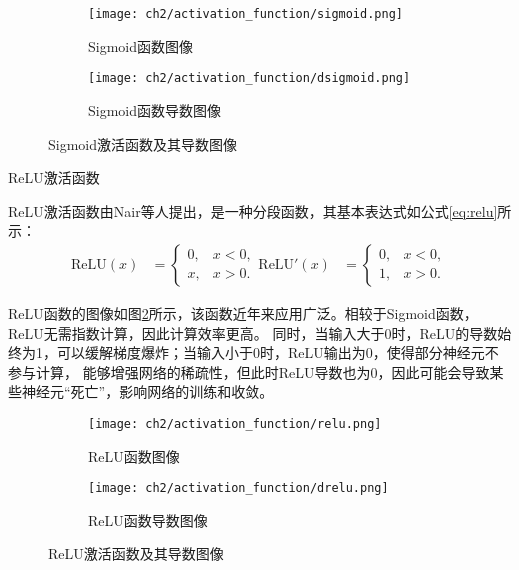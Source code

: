 \begin{figure}[H]
  \centering
  \begin{subfigure}[t]{0.45\textwidth}
    \centering
    \texttt{[image: ch2/activation\_function/sigmoid.png]}
    \caption{Sigmoid函数图像}
  \end{subfigure}
  \begin{subfigure}[t]{0.45\textwidth}
    \centering
    \texttt{[image: ch2/activation\_function/dsigmoid.png]}
    \caption{Sigmoid函数导数图像}
  \end{subfigure}
  \caption{Sigmoid激活函数及其导数图像}
  \label{fig:sigmoid}
\end{figure}

 ReLU激活函数

ReLU激活函数由Nair等人\cite{Nair_Hinton_2010}提出，是一种分段函数，其基本表达式如公式\eqref{eq:relu}所示：
\begin{equation}
  \begin{aligned}
  \text{ReLU}(x) &= \begin{cases}
    0, & x < 0, \\
    x, & x > 0.
    \end{cases}
  \text{ReLU}'(x) &= \begin{cases}
  0, & x < 0, \\
  1, & x > 0.
  \end{cases}
  \end{aligned}
  \label{eq:relu}
\end{equation}

ReLU函数的图像如图\ref{fig:relu}所示，该函数近年来应用广泛。相较于Sigmoid函数，ReLU无需指数计算，因此计算效率更高。
同时，当输入大于0时，ReLU的导数始终为1，可以缓解梯度爆炸；当输入小于0时，ReLU输出为0，使得部分神经元不参与计算，
能够增强网络的稀疏性，但此时ReLU导数也为0，因此可能会导致某些神经元“死亡”，影响网络的训练和收敛。

\begin{figure}[H]
  \centering
  \begin{subfigure}[t]{0.45\textwidth}
    \centering
    \texttt{[image: ch2/activation\_function/relu.png]}
    \caption{ReLU函数图像}
  \end{subfigure}
  \begin{subfigure}[t]{0.45\textwidth}
    \centering
    \texttt{[image: ch2/activation\_function/drelu.png]}
    \caption{ReLU函数导数图像}
  \end{subfigure}
  \caption{ReLU激活函数及其导数图像}
  \label{fig:relu}
\end{figure}

